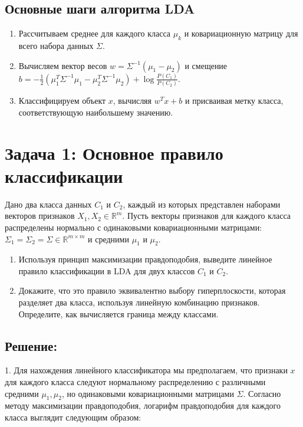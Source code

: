 \subsection*{Основные шаги алгоритма LDA}
\begin{enumerate}
    \item Рассчитываем среднее для каждого класса \( \mu_k \) и ковариационную матрицу для всего набора данных \( \Sigma \).
    \item Вычисляем вектор весов \( w = \Sigma^{-1} (\mu_1 - \mu_2) \) и смещение \( b = -\frac{1}{2} (\mu_1^T \Sigma^{-1} \mu_1 - \mu_2^T \Sigma^{-1} \mu_2) + \log \frac{P(C_1)}{P(C_2)} \).
    \item Классифицируем объект \( x \), вычисляя \( w^T x + b \) и присваивая метку класса, соответствующую наибольшему значению.
\end{enumerate}

\section*{Задача 1: Основное правило классификации}

Дано два класса данных \( C_1 \) и \( C_2 \), каждый из которых представлен наборами векторов признаков \( X_1, X_2 \in \mathbb{R}^m \). Пусть векторы признаков для каждого класса распределены нормально с одинаковыми ковариационными матрицами: \( \Sigma_1 = \Sigma_2 = \Sigma \in \mathbb{R}^{m \times m} \) и средними \( \mu_1 \) и \( \mu_2 \).

\begin{enumerate}
    \item Используя принцип максимизации правдоподобия, выведите линейное правило классификации в LDA для двух классов \( C_1 \) и \( C_2 \).
    \item Докажите, что это правило эквивалентно выбору гиперплоскости, которая разделяет два класса, используя линейную комбинацию признаков. Определите, как вычисляется граница между классами.
\end{enumerate}

\subsection*{Решение:}

1. Для нахождения линейного классификатора мы предполагаем, что признаки \( x \) для каждого класса следуют нормальному распределению с различными средними \( \mu_1, \mu_2 \), но одинаковыми ковариационными матрицами \( \Sigma \). Согласно методу максимизации правдоподобия, логарифм правдоподобия для каждого класса выглядит следующим образом:

